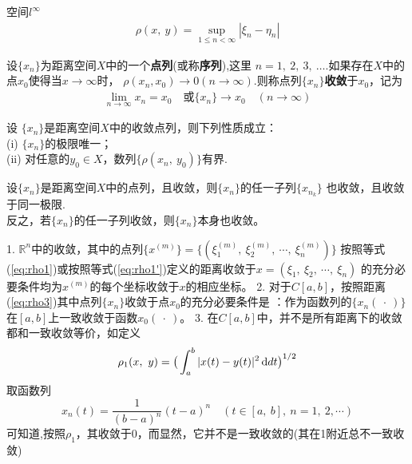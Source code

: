 \begin{newex}
	空间$l^\infty$
	\begin{align}
		\rho(x, \ y)= \sup_{1 \leqslant n < \infty} |\xi_n-\eta_n|
	\end{align}
\end{newex}

\begin{newdef}
	设$\{ x_n \}$为距离空间$X$中的一个\textbf{点列}(或称\textbf{序列}),这里
	$n=1,\ 2,\ 3,\ \dots$.如果存在$X$中的点$x_0$使得当$x \rightarrow \infty$时，
	$\rho(x_n,x_0) \rightarrow 0 (n \rightarrow \infty)$.则称点列$\{x_n \}$\textbf{收敛}于$x_0$，记为
	\begin{align*}
		\lim_{n \rightarrow \infty} x_n =x_0 \quad \mbox{或} \{x_n\} \rightarrow x_0 \quad (n \rightarrow \infty)
	\end{align*}
\end{newdef}

\begin{newthem}
	设 $\{ x_n\}$是距离空间$X$中的收敛点列，则下列性质成立：\\
	(i) $\{x_n \}$的极限唯一；\\
	(ii) 对任意的$y_0 \in X$，数列$\{\rho (x_n, \ y_0) \}$有界.
\end{newthem}

\begin{newthem}
	设$\{ x_n \}$是距离空间$X$中的点列，且收敛，则$\{x_n \}$的任一子列$\{ x_{n_k} \}$
	也收敛，且收敛于同一极限.\\
	反之，若$\{ x_n \}$的任一子列收敛，则$\{ x_n\}$本身也收敛。
\end{newthem}

\begin{note}
	1. $\mathbb R^n$中的收敛，其中的点列$\{ x^{(m)}\} = \{  (\xi_1^{(m)},\ \xi_2^{(m)},\ \cdots , \ \xi_n^{(m)}) \}$
	按照等式(\eqref{eq:rho1})或按照等式(\ref{eq:rho1'})定义的距离收敛于$x = (\xi_1, \ \xi_2 , \ \cdots , \ \xi_n)$
	的充分必要条件均为$x ^{(m)}$的每个坐标收敛于$x$的相应坐标。
	2. 对于$C[a,b]$，按照距离(\ref{eq:rho3})其中点列$\{ x_n\}$收敛于点$x_0$的充分必要条件是
	：作为函数列的$\{x_n(\  \cdot\  )\}$在$\left[ a,b \right]$上一致收敛于函数$x_0(\ \cdot \ )$。
	3. 在$C[a,b]$中，并不是所有距离下的收敛都和一致收敛等价，如定义
	$$\rho_1(x,\ y)=\big(  \int_a^b |x(t)-y(t)|^2 \operatorname{d\!} d t   \big)^{1/2}$$
	取函数列$$x_n(t)=\dfrac{1}{(b-a)^n}(t-a)^n \quad \left(  t \in \left[a,\ b \right],\ n=1,\ 2, \cdots \right) $$
	可知道,按照$\rho_1$，其收敛于0，而显然，它并不是一致收敛的(其在1附近总不一致收敛)
\end{note}

